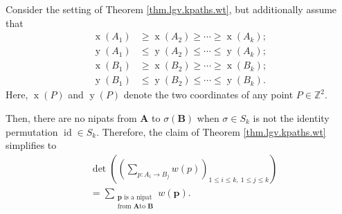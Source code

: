 \begin{corollary}
\label{cor.lgv.kpaths.wt-np}%
Consider the setting of Theorem \ref{thm.lgv.kpaths.wt}, but additionally
assume that%
\begin{align}
\operatorname*{x}\left(  A_{1}\right)   &  \geq\operatorname*{x}\left(
A_{2}\right)  \geq\cdots\geq\operatorname*{x}\left(  A_{k}\right)
;\label{eq.cor.lgv.kpaths.wt-np.xA}\\
\operatorname*{y}\left(  A_{1}\right)   &  \leq\operatorname*{y}\left(
A_{2}\right)  \leq\cdots\leq\operatorname*{y}\left(  A_{k}\right)
;\label{eq.cor.lgv.kpaths.wt-np.yA}\\
\operatorname*{x}\left(  B_{1}\right)   &  \geq\operatorname*{x}\left(
B_{2}\right)  \geq\cdots\geq\operatorname*{x}\left(  B_{k}\right)
;\label{eq.cor.lgv.kpaths.wt-np.xB}\\
\operatorname*{y}\left(  B_{1}\right)   &  \leq\operatorname*{y}\left(
B_{2}\right)  \leq\cdots\leq\operatorname*{y}\left(  B_{k}\right)  .
\label{eq.cor.lgv.kpaths.wt-np.yB}%
\end{align}
Here, $\operatorname*{x}\left(  P\right)  $ and $\operatorname*{y}\left(
P\right)  $ denote the two coordinates of any point $P\in\mathbb{Z}^{2}$.

Then, there are no nipats from $\mathbf{A}$ to $\sigma\left(  \mathbf{B}%
\right)  $ when $\sigma\in S_{k}$ is not the identity permutation
$\operatorname*{id}\in S_{k}$. Therefore, the claim of Theorem
\ref{thm.lgv.kpaths.wt} simplifies to
\begin{align}
&  \det\left(  \left(  \sum_{p:A_{i}\rightarrow B_{j}}w\left(  p\right)
\right)  _{1\leq i\leq k,\ 1\leq j\leq k}\right) \nonumber\\
&  =\sum_{\substack{\mathbf{p}\text{ is a nipat}\\\text{from }\mathbf{A}\text{
to }\mathbf{B}}}w\left(  \mathbf{p}\right)  .
\label{eq.cor.lgv.kpaths.wt-np.claim}%
\end{align}

\end{corollary}

